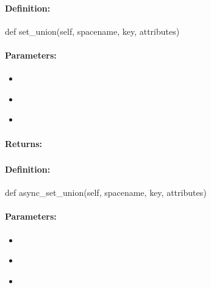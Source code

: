 \paragraph{Definition:}
\begin{pythoncode}
def set_union(self, spacename, key, attributes)
\end{pythoncode}

\paragraph{Parameters:}
\begin{itemize}[noitemsep]
\item {}\\

\item {}\\

\item {}\\

\end{itemize}

\paragraph{Returns:}


\pagebreak
\subsubsection{}
\label{api:python:async_set_union}


\paragraph{Definition:}
\begin{pythoncode}
def async_set_union(self, spacename, key, attributes)
\end{pythoncode}

\paragraph{Parameters:}
\begin{itemize}[noitemsep]
\item {}\\

\item {}\\

\item {}\\

\end{itemize}

